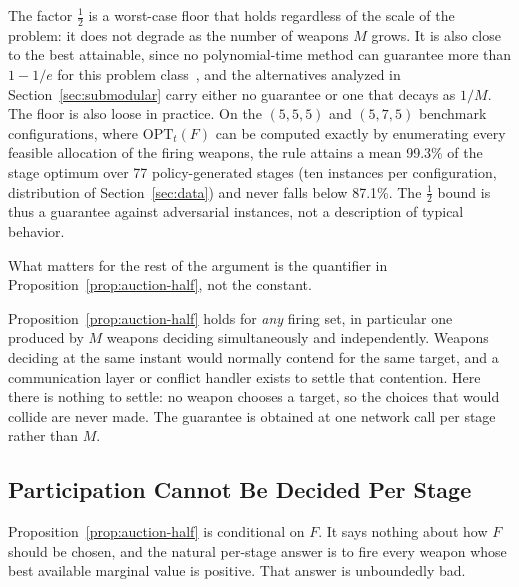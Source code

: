 The factor $\tfrac12$ is a worst-case floor that holds regardless of the scale of the problem: it does not degrade as the number of weapons $M$ grows. It is also close to the best attainable, since no polynomial-time method can guarantee more than $1-1/e$ for this problem class~\cite{feige1998threshold}, and the alternatives analyzed in Section~\ref{sec:submodular} carry either no guarantee or one that decays as $1/M$. The floor is also loose in practice. On the $(5,5,5)$ and $(5,7,5)$ benchmark configurations, where $\text{OPT}_t(F)$ can be computed exactly by enumerating every feasible allocation of the firing weapons, the rule attains a mean 99.3\% of the stage optimum over 77 policy-generated stages (ten instances per configuration, distribution of Section~\ref{sec:data}) and never falls below 87.1\%. The $\tfrac12$ bound is thus a guarantee against adversarial instances, not a description of typical behavior.

What matters for the rest of the argument is the quantifier in
Proposition~\ref{prop:auction-half}, not the constant.

\begin{remark}
\label{rem:auction-kills-pileon}
Proposition~\ref{prop:auction-half} holds for \emph{any} firing set, in
particular one produced by $M$ weapons deciding simultaneously and
independently. Weapons deciding at the same instant would normally contend
for the same target, and a communication layer or conflict handler exists to
settle that contention. Here there is nothing to settle: no weapon chooses a
target, so the choices that would collide are never made. The guarantee is
obtained at one network call per stage rather than $M$.
\end{remark}

\subsection{Participation Cannot Be Decided Per Stage}

Proposition~\ref{prop:auction-half} is conditional on $F$. It says nothing
about how $F$ should be chosen, and the natural per-stage answer is to fire
every weapon whose best available marginal value is positive. That answer is
unboundedly bad.

